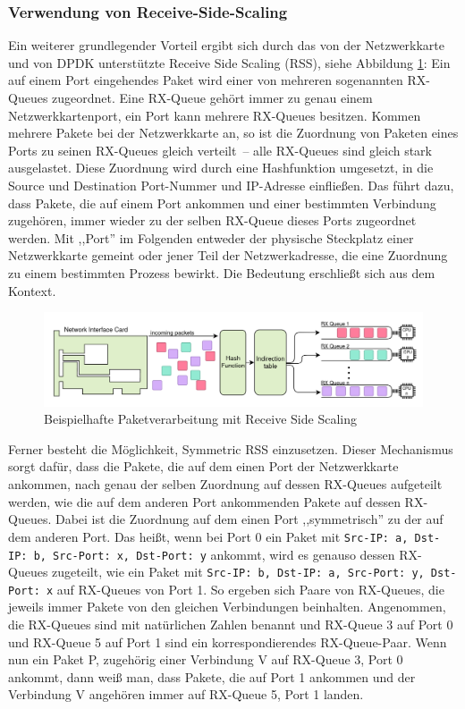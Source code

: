 \documentclass[../review_2.tex]{subfiles}
\begin{document}
\subsubsection{Verwendung von Receive-Side-Scaling}
Ein weiterer grundlegender Vorteil ergibt sich durch das von der Netzwerkkarte und von DPDK unterstützte Receive Side Scaling (RSS), siehe Abbildung \ref{fig:Receive-Side-Scaling}: Ein auf einem Port eingehendes Paket wird einer von mehreren sogenannten RX-Queues zugeordnet. Eine RX-Queue gehört immer zu genau einem Netzwerkkartenport, ein Port kann mehrere RX-Queues besitzen. Kommen mehrere Pakete bei der Netzwerkkarte an, so ist die Zuordnung von Paketen eines Ports zu seinen RX-Queues gleich verteilt~-- alle RX-Queues sind gleich stark ausgelastet. Diese Zuordnung wird durch eine Hashfunktion umgesetzt, in die Source und Destination Port-Nummer und IP-Adresse einfließen. Das führt dazu, dass Pakete, die auf einem Port ankommen und einer bestimmten Verbindung zugehören, immer wieder zu der selben RX-Queue dieses Ports zugeordnet werden. Mit ,,Port'' im Folgenden entweder der physische Steckplatz einer Netzwerkkarte gemeint oder jener Teil der Netzwerkadresse, die eine Zuordnung zu einem bestimmten Prozess bewirkt. Die Bedeutung erschließt sich aus dem Kontext.

\begin{figure}[H]
    \centering
    \includegraphics[width=0.95\linewidth]{img/Receive-Side-Scaling.png}
    \caption{Beispielhafte Paketverarbeitung mit Receive Side Scaling}
    \label{fig:Receive-Side-Scaling}
\end{figure}

Ferner besteht die Möglichkeit, Symmetric RSS einzusetzen. Dieser Mechanismus sorgt dafür, dass die Pakete, die auf dem einen Port der Netzwerkkarte ankommen, nach genau der selben Zuordnung auf dessen RX-Queues aufgeteilt werden, wie die auf dem anderen Port ankommenden Pakete auf dessen RX-Queues. Dabei ist die Zuordnung auf dem einen Port ,,symmetrisch'' zu der auf dem anderen Port. Das heißt, wenn bei Port 0 ein Paket mit \texttt{Src-IP: a, Dst-IP: b, Src-Port: x, Dst-Port: y} ankommt, wird es genauso dessen RX-Queues zugeteilt, wie ein Paket mit \texttt{Src-IP: b, Dst-IP: a, Src-Port: y, Dst-Port: x} auf RX-Queues von Port 1. So ergeben sich Paare von RX-Queues, die jeweils immer Pakete von den gleichen Verbindungen beinhalten. Angenommen, die RX-Queues sind mit natürlichen Zahlen benannt und RX-Queue 3 auf Port 0 und RX-Queue 5 auf Port 1 sind ein korrespondierendes RX-Queue-Paar. Wenn nun ein Paket P, zugehörig einer Verbindung V auf RX-Queue 3, Port 0 ankommt, dann weiß man, dass Pakete, die auf Port 1 ankommen und der Verbindung V angehören immer auf RX-Queue 5, Port 1 landen.
\end{document}
